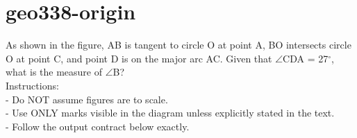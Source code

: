 \documentclass[12pt]{article}
\begin{document}
\section*{geo338-origin}
\noindent\begin{minipage}{\textwidth}
\setlength{\parskip}{4pt}
As shown in the figure, AB is tangent to circle O at point A, BO intersects circle O at point C, and point D is on the major arc AC. Given that \ensuremath{\angle }CDA = 27\ensuremath{^\circ}, what is the measure of \ensuremath{\angle }B?\\
Instructions:\\
- Do NOT assume figures are to scale.\\
- Use ONLY marks visible in the diagram unless explicitly stated in the text.\\
- Follow the output contract below exactly.\\
\end{minipage}
\end{document}
